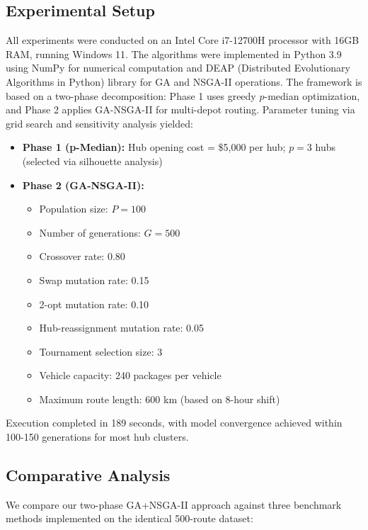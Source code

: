 \documentclass[conference]{IEEEtran}
\begin{document}
\subsection{Experimental Setup}

All experiments were conducted on an Intel Core i7-12700H processor with 16GB RAM, running Windows 11. The algorithms were implemented in Python 3.9 using NumPy for numerical computation and DEAP (Distributed Evolutionary Algorithms in Python) library for GA and NSGA-II operations. The framework is based on a two-phase decomposition: Phase 1 uses greedy $p$-median optimization, and Phase 2 applies GA-NSGA-II for multi-depot routing. Parameter tuning via grid search and sensitivity analysis yielded:

\begin{itemize}
\item \textbf{Phase 1 (p-Median):} Hub opening cost = \$5,000 per hub; $p = 3$ hubs (selected via silhouette analysis)
\item \textbf{Phase 2 (GA-NSGA-II):}
  \begin{itemize}
    \item Population size: $P = 100$
    \item Number of generations: $G = 500$
    \item Crossover rate: 0.80
    \item Swap mutation rate: 0.15
    \item 2-opt mutation rate: 0.10
    \item Hub-reassignment mutation rate: 0.05
    \item Tournament selection size: 3
    \item Vehicle capacity: 240 packages per vehicle
    \item Maximum route length: 600 km (based on 8-hour shift)
  \end{itemize}
\end{itemize}

Execution completed in 189 seconds, with model convergence achieved within 100-150 generations for most hub clusters.

\subsection{Comparative Analysis}

We compare our two-phase GA+NSGA-II approach against three benchmark methods implemented on the identical 500-route dataset:
\end{document}
